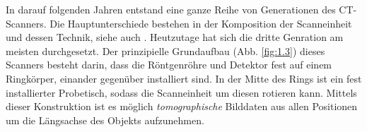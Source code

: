 In darauf folgenden Jahren entstand eine ganze Reihe von Generationen des CT-Scanners. Die Hauptunterschiede bestehen in der Komposition der Scanneinheit und dessen Technik, siehe auch \cite[Kap.\ 3]{Buzug04}. Heutzutage hat sich die dritte Genration am meisten durchgesetzt. Der prinzipielle Grundaufbau (Abb. \ref{fig:1.3}) dieses Scanners besteht darin, dass die Röntgenröhre und Detektor fest auf einem Ringkörper, einander gegenüber installiert sind. In der Mitte des Rings ist ein fest installierter Probetisch, sodass die Scanneinheit um diesen rotieren kann. Mittels dieser Konstruktion ist es möglich \textit{tomographische} Bilddaten aus allen Positionen um die Längsachse des Objekts aufzunehmen.
